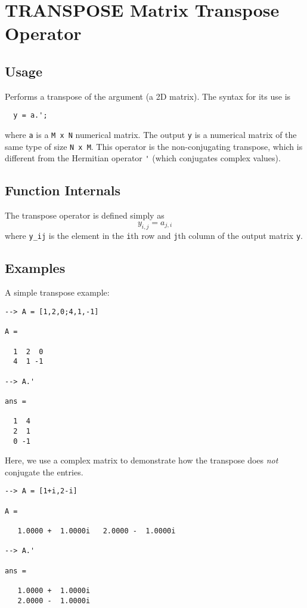 \section{TRANSPOSE Matrix Transpose Operator}

\subsection{Usage}

Performs a transpose of the argument (a 2D matrix).  The syntax for its use is
\begin{verbatim}
  y = a.';
\end{verbatim}
where \verb|a| is a \verb|M x N| numerical matrix.  The output \verb|y| is a numerical matrix
of the same type of size \verb|N x M|.  This operator is the non-conjugating transpose,
which is different from the Hermitian operator \verb|'| (which conjugates complex values).
\subsection{Function Internals}

The transpose operator is defined simply as
\[
  y_{i,j} = a_{j,i}
\]
where \verb|y_ij| is the element in the \verb|i|th row and \verb|j|th column of the output matrix \verb|y|.
\subsection{Examples}

A simple transpose example:
\begin{verbatim}
--> A = [1,2,0;4,1,-1]

A = 

  1  2  0 
  4  1 -1 

--> A.'

ans = 

  1  4 
  2  1 
  0 -1 
\end{verbatim}
Here, we use a complex matrix to demonstrate how the transpose does \emph{not} conjugate the entries.
\begin{verbatim}
--> A = [1+i,2-i]

A = 

   1.0000 +  1.0000i   2.0000 -  1.0000i 

--> A.'

ans = 

   1.0000 +  1.0000i 
   2.0000 -  1.0000i 
\end{verbatim}

